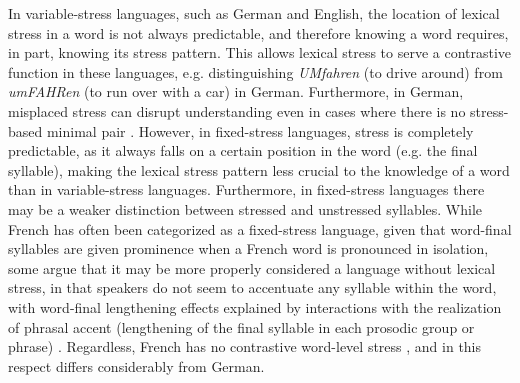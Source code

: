 \documentclass[a4paper]{article}
\begin{document}
In variable-stress languages, such as German and English, 
the location of lexical stress in a word is not always predictable,
and therefore knowing a word requires, in part, knowing its stress pattern. This allows lexical stress to serve a contrastive function in these languages, 
e.g. distinguishing \textit{UMfahren} (to drive around) from \textit{umFAHRen} (to run over with a car) in German. 
Furthermore, in German, misplaced stress can disrupt understanding even in cases where there is no stress-based minimal pair \cite{Hirschfeld1994}.
%
However, in fixed-stress languages, stress is completely predictable, as it always falls on a certain position in the word (e.g. the final syllable), making the lexical stress pattern less crucial to the knowledge of a word than in variable-stress languages. 
Furthermore, 
in fixed-stress languages there may be a weaker distinction between stressed and unstressed syllables.
While French has often been categorized as a fixed-stress language, given that word-final syllables are given prominence when a French word is pronounced in isolation, some argue that it may be more properly considered a language without lexical stress, in that speakers do not seem to accentuate any syllable within the word, with word-final lengthening effects explained by interactions with the realization of phrasal accent (lengthening of the final syllable in each prosodic group or phrase) \cite{Dupoux2008,Michaux2013}. 
Regardless, French has no contrastive word-level stress \cite[p.~89]{Michaux2013}, 
and in this respect differs considerably from German.
\end{document}
